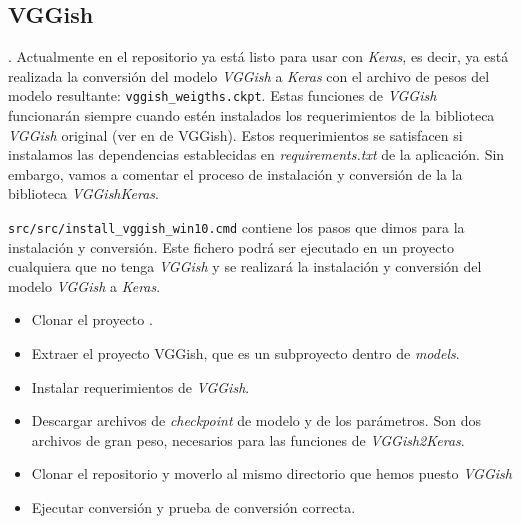 \subsection{VGGish}\label{subsec:vggishinstall}.
Actualmente en el repositorio ya está listo para usar con \textit{Keras}, es decir, ya está realizada la conversión del modelo \textit{VGGish} a \textit{Keras} con el archivo de pesos del modelo resultante: \texttt{vggish\_weigths.ckpt}. Estas funciones de \textit{VGGish} funcionarán siempre cuando estén instalados los requerimientos de la biblioteca \textit{VGGish} original (ver en  de VGGish). Estos requerimientos se satisfacen si instalamos las dependencias establecidas en \textit{requirements.txt} de la aplicación. Sin embargo, vamos a comentar el proceso de instalación y conversión de la la biblioteca \textit{VGGishKeras}.

\texttt{src/src/install\_vggish\_win10.cmd} contiene los pasos que dimos para la instalación y conversión. Este fichero podrá ser ejecutado en un proyecto cualquiera que no tenga \textit{VGGish} y se realizará la instalación y conversión del modelo \textit{VGGish} a \textit{Keras}.
\begin{itemize}
\item Clonar el proyecto .
\item Extraer el proyecto VGGish, que es un subproyecto dentro de  \textit{models}.
\item Instalar requerimientos de \textit{VGGish}.
\item Descargar archivos de \textit{checkpoint} de modelo y de los parámetros. Son dos archivos de gran peso, necesarios para las funciones de \textit{VGGish2Keras}.
\item Clonar el repositorio  y moverlo al mismo directorio que hemos puesto \textit{VGGish}
\item Ejecutar conversión y prueba de conversión correcta.
\end{itemize}


